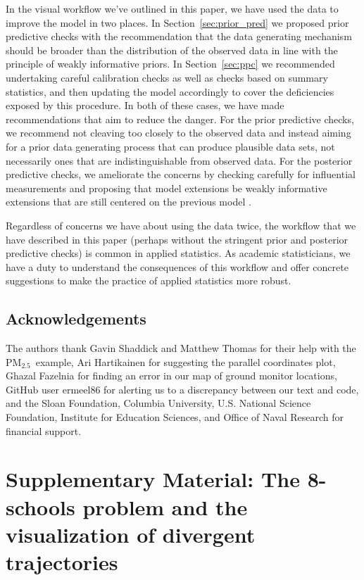 \documentclass{statsoc}
\newcommand{\PM}{PM$_{2.5}$}
\begin{document}
In the visual workflow we've outlined in this paper, we have used the data to
improve the model in two places. In Section~\ref{sec:prior_pred} we proposed
prior predictive checks with the recommendation that the data generating
mechanism should be broader than the distribution of the observed data in line
with the principle of weakly informative priors. In Section~\ref{sec:ppc} we
recommended undertaking careful calibration checks as well as checks based on
summary statistics, and then updating the model accordingly to cover the
deficiencies exposed by this procedure. In both of these cases, we have made
recommendations that aim to reduce the danger. For the prior predictive checks,
we recommend not cleaving too closely to the observed data and instead aiming
for a prior data generating process that can produce plausible data sets, not
necessarily ones that are indistinguishable from observed data. For the
posterior predictive checks, we ameliorate the concerns by checking carefully
for influential measurements and proposing that model extensions be weakly
informative extensions that are still centered on the previous model
\citep{simpson2017penalising}.

Regardless of concerns we have about using the data twice, the workflow that we
have described in this paper (perhaps without the stringent prior and posterior
predictive checks) is common in applied statistics. As academic statisticians,
we have a duty to understand the consequences of this workflow and offer
concrete suggestions to make the practice of applied statistics more robust.

\subsection*{Acknowledgements}

The authors thank Gavin Shaddick and Matthew Thomas for their help with the \PM\
example, Ari Hartikainen for suggesting the parallel coordinates plot, 
Ghazal Fazelnia for finding an error in our map of ground monitor locations, 
GitHub user ermeel86 for alerting us to a discrepancy between our text and code, 
and the Sloan Foundation, Columbia University, U.S. National Science Foundation,
Institute for Education Sciences, and Office of Naval Research for financial support.







\clearpage
\section*{Supplementary Material: The 8-schools problem and the visualization of divergent trajectories} 
\end{document}
